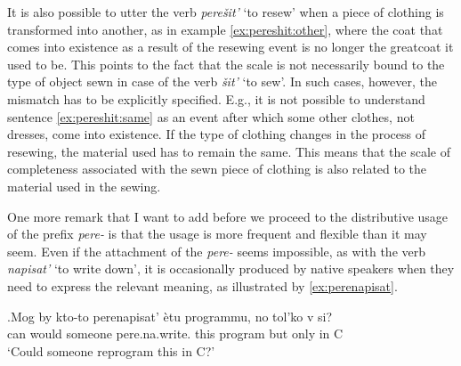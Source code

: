 It is also possible to utter the verb \textit{pere\v{s}it'} `to resew' when a piece of clothing is transformed into another, as in example \ref{ex:pereshit:other}, where the coat that comes into existence as a result of the resewing event is no longer the greatcoat it used to be. This points to the fact that the scale is not necessarily bound to the type of object sewn in case of the verb \textit{\v{s}it'} `to sew'. In such cases, however, the mismatch has to be explicitly specified. E.g., it is not possible to understand sentence \ref{ex:pereshit:same} as an event after which some other clothes, not dresses, come into existence.  If the type of clothing changes in the process of resewing, the material used has to remain the same. This means that the scale of completeness associated with the sewn piece of clothing is also related to the material used in the sewing.


One more remark that I want to add before we proceed to the distributive usage of the prefix \textit{pere-} is that the  usage is more frequent and flexible than it may seem. Even if the attachment of the  \textit{pere-} seems impossible, as with the verb \textit{napisat'} `to write down', it is occasionally produced by native speakers when they need to express the relevant meaning, as illustrated by \ref{ex:perenapisat}. 

\exg.\label{ex:perenapisat}Mog by kto-to perenapisat' \`{e}tu programmu, no tol'ko v si?\\
can would someone pere.na.write. this program but only in C\\
\trans `Could someone reprogram this in C?'


